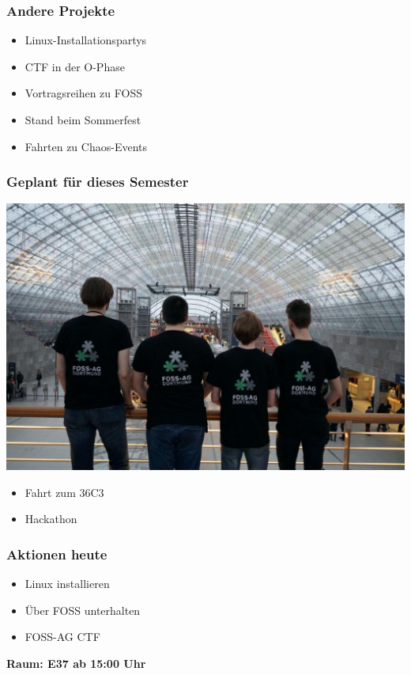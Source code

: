 \documentclass[12pt,utf8]{beamer}
\begin{document}
	\begin{frame}
		\frametitle{Andere Projekte}
		\begin{itemize}
			\item Linux-Installationspartys
			\vspace{0.5cm}
			\item CTF in der O-Phase
			\vspace{0.5cm}
			\item Vortragsreihen zu FOSS
			\vspace{0.5cm}
			\item Stand beim Sommerfest
			\vspace{0.5cm}
			\item Fahrten zu Chaos-Events
		\end{itemize}
	\end{frame}
	\begin{frame}
		\frametitle{Geplant für dieses Semester}

			
			\centering\includegraphics[width=0.9\linewidth]{resources/35C3.jpeg}
		\begin{itemize}
			\item Fahrt zum 36C3
			\item Hackathon
		\end{itemize}
	\end{frame}

	\begin{frame}
		\frametitle{Aktionen heute}
		\begin{itemize}
			\item Linux installieren
			\vspace{0.5cm}
			\item Über FOSS unterhalten
			\vspace{0.5cm}
			\item FOSS-AG CTF	
		\end{itemize}
	\vspace{0.5cm}
	\textbf{Raum: E37 ab 15:00 Uhr}
	\end{frame}
	
\end{document}
